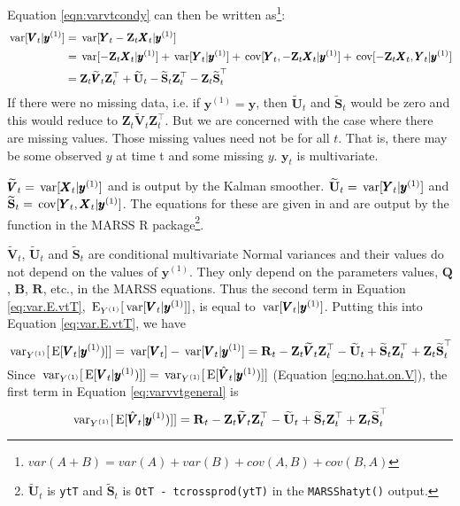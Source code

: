 \documentclass[]{article}
\def\UPS{\mbox{\boldmath $\Upsilon$}}
\def\XI{\mbox{\boldmath $\Xi$}}
\def\BB{\mbox{$\mathbf B$}}	\def\bb{\mbox{$\mathbf b$}} \def\Bb{\mbox{$\mathbf J$}} \def\Ba{\mbox{$\mathbf L$}} \def\Bm{\UPS}
\def\E{\,\textup{\textrm{E}}}
\def\QQ{\mbox{$\mathbf Q$}}	 \def\qq{\mbox{$\mathbf q$}} \def\Qb{\mbox{$\mathbf G$}}  \def\Qm{\mathbb{Q}}
\def\RR{\mbox{$\mathbf R$}}	 \def\rr{\mbox{$\mathbf r$}} \def\Rb{\mbox{$\mathbf H$}}	\def\Rm{\mathbb{R}}
\def\Ss{\mbox{$\mathbf S$}}
\def\UU{\mbox{$\mathbf U$}}	\def\uu{\mbox{$\mathbf u$}}
\def\VV{\mbox{$\pmb{V}$}}	\def\vv{\mbox{$\pmb{v}$}}
\def\XX{\mbox{$\pmb{X}$}}	\def\xx{\mbox{$\pmb{x}$}}
\def\YY{\mbox{$\pmb{Y}$}}	\def\yy{\mbox{$\pmb{y}$}}
\def\ZZ{\mbox{$\mathbf Z$}}	\def\zz{\mbox{$\mathbf z$}}	\def\Zb{\mbox{$\mathbf M$}} \def\Za{\mbox{$\mathbf N$}} \def\Zm{\XI}
\def\var{\,\textup{\textrm{var}}}
\def\cov{\,\textup{\textrm{cov}}}
\def\hatVt{\widetilde{\VV}_t}
\def\hatUt{\widetilde{\UU}_t}
\def\hatSt{\widetilde{\Ss}_t}
\begin{document}
Equation \ref{eqn:varvtcondy} can then be written as\footnote{$var(A+B)=var(A)+var(B)+cov(A,B)+cov(B,A)$}:
\begin{equation}
\begin{split}
\var[\VV_t|\yy^{(1)}] &= \var[ \YY_t - \ZZ_t\XX_t | \yy^{(1)} ]\\
&=\var[ - \ZZ_t\XX_t | \yy^{(1)} ] + \var[ \YY_t|\yy^{(1)}] + \cov[ \YY_t, - \ZZ_t\XX_t | \yy^{(1)} ] + \cov[ - \ZZ_t\XX_t, \YY_t | \yy^{(1)} ]\\
&=\ZZ_t \hatVt \ZZ_t^\top + \hatUt - \hatSt\ZZ_t^\top - \ZZ_t\hatSt^\top
\end{split}
\end{equation}
If there were no missing data, i.e. if $\yy^{(1)}=\yy$, then $\hatUt$ and $\hatSt$ would be zero and this would reduce to $\ZZ_t \hatVt \ZZ_t^\top$. But we are concerned with the case where there are missing values. Those missing values need not be for all $t$. That is, there may be some observed $y$ at time t and some missing $y$. $\yy_t$ is multivariate.

$\hatVt = \var[ \XX_t | \yy^{(1)} ]$ and is output by the Kalman smoother. $\hatUt=\var[\YY_t|\yy^{(1)}]$ and $\hatSt=\cov[\YY_t,\XX_t|\yy^{(1)}]$. The equations for these are given in \citet{Holmes2010} and are output by the \verb@MARSShatyt@ function in the MARSS R package\footnote{$\hatUt$ is \texttt{ytT} and $\hatSt$ is \texttt{OtT - tcrossprod(ytT)} in the \texttt{MARSShatyt()} output.}.

$\hatVt$, $\hatUt$ and $\hatSt$ are conditional multivariate Normal variances and their values do not depend on the values of $\yy^{(1)}$.  They only depend on the parameters values, $\QQ$, $\BB$, $\RR$, etc., in the MARSS equations. Thus the second term in Equation \ref{eq:var.E.vtT}, $\E_{Y^{(1)}}[\var[\VV_t|\yy^{(1)}]]$, is equal to $\var[\VV_t|\yy^{(1)}]$. Putting this into Equation \ref{eq:var.E.vtT}, we have
\begin{equation}\label{eqn:conditionalvtfinala}
\var_{Y^{(1)}}[\E[\VV_t|\yy^{(1)})]]  = \var[\VV_t] - \var[\VV_t|\yy^{(1)}] = \RR_t - \ZZ_t \hatVt \ZZ_t^\top - \hatUt + \hatSt\ZZ_t^\top + \ZZ_t\hatSt^\top
\end{equation}
Since $\var_{Y^{(1)}}[\E[\VV_t|\yy^{(1)})]] = \var_{Y^{(1)}}[\E[\hat{\VV}_t|\yy^{(1)})]]$ (Equation \ref{eq:no.hat.on.V}), the first term in Equation \ref{eq:varvvtgeneral} is
\begin{equation}\label{eqn:conditionalvtfinal}
\var_{Y^{(1)}}[\E[\hat{\VV}_t|\yy^{(1)})]]  =  \RR_t - \ZZ_t \hatVt \ZZ_t^\top - \hatUt + \hatSt\ZZ_t^\top + \ZZ_t\hatSt^\top
\end{equation}
\end{document}

